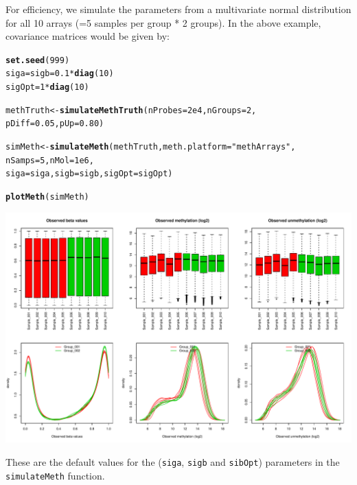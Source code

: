 \documentclass{article}\usepackage[]{graphicx}\usepackage[usenames,dvipsnames]{color}
\makeatletter
\def\maxwidth{ %
  \ifdim\Gin@nat@width>\linewidth
    \linewidth
  \else
    \Gin@nat@width
  \fi
}
\newcommand{\hlnum}[1]{\textcolor[rgb]{0.686,0.059,0.569}{#1}}%
\newcommand{\hlstr}[1]{\textcolor[rgb]{0.192,0.494,0.8}{#1}}%
\newcommand{\hlopt}[1]{\textcolor[rgb]{0,0,0}{#1}}%
\newcommand{\hlstd}[1]{\textcolor[rgb]{0.345,0.345,0.345}{#1}}%
\newcommand{\hlkwb}[1]{\textcolor[rgb]{0.69,0.353,0.396}{#1}}%
\newcommand{\hlkwc}[1]{\textcolor[rgb]{0.333,0.667,0.333}{#1}}%
\newcommand{\hlkwd}[1]{\textcolor[rgb]{0.737,0.353,0.396}{\textbf{#1}}}%
\newenvironment{kframe}{%
 \def\at@end@of@kframe{}%
 \ifinner\ifhmode%
  \def\at@end@of@kframe{\end{minipage}}%
  \begin{minipage}{\columnwidth}%
 \fi\fi%
 \def\FrameCommand##1{\hskip\@totalleftmargin \hskip-\fboxsep
 \colorbox{shadecolor}{##1}\hskip-\fboxsep
     \hskip-\linewidth \hskip-\@totalleftmargin \hskip\columnwidth}%
 \MakeFramed {\advance\hsize-\width
   \@totalleftmargin\z@ \linewidth\hsize
   \@setminipage}}%
 {\par\unskip\endMakeFramed%
 \at@end@of@kframe}
\newenvironment{knitrout}{}{} %
\makeatother
\begin{document}
For efficiency, we simulate the parameters from a multivariate normal 
distribution for all 10 arrays (=5 samples per group * 2 groups). In the 
above example, covariance matrices would be given by:
\begin{knitrout}
\color{fgcolor}\begin{kframe}
\begin{alltt}
\hlkwd{set.seed}\hlstd{(}\hlnum{999}\hlstd{)}
\hlstd{siga} \hlkwb{=} \hlstd{sigb} \hlkwb{=} \hlnum{0.1} \hlopt{*} \hlkwd{diag}\hlstd{(}\hlnum{10}\hlstd{)}
\hlstd{sigOpt} \hlkwb{=} \hlnum{1} \hlopt{*} \hlkwd{diag}\hlstd{(}\hlnum{10}\hlstd{)}

\hlstd{methTruth} \hlkwb{<-} \hlkwd{simulateMethTruth}\hlstd{(}\hlkwc{nProbes} \hlstd{=} \hlnum{2e4}\hlstd{,} \hlkwc{nGroups} \hlstd{=} \hlnum{2}\hlstd{,}
                               \hlkwc{pDiff} \hlstd{=} \hlnum{0.05}\hlstd{,} \hlkwc{pUp} \hlstd{=} \hlnum{0.80}\hlstd{)}
\end{alltt}


{\ttfamily\noindent\itshape\color{messagecolor}{\#\# [quantroSim]: Simulating a mixture of 3 Normal distributions \\\#\#\ \ \ \ \ \ \ \ \ \ \ \  with mean (-3, 1, 3) and standard deviation (3, 0.4, 3)}}\begin{alltt}
\hlstd{simMeth} \hlkwb{<-} \hlkwd{simulateMeth}\hlstd{(methTruth,}  \hlkwc{meth.platform} \hlstd{=} \hlstr{"methArrays"}\hlstd{,}
                        \hlkwc{nSamps} \hlstd{=} \hlnum{5}\hlstd{,} \hlkwc{nMol} \hlstd{=} \hlnum{1e6}\hlstd{,}
                        \hlkwc{siga} \hlstd{= siga,} \hlkwc{sigb} \hlstd{= sigb,} \hlkwc{sigOpt} \hlstd{= sigOpt)}
\end{alltt}


{\ttfamily\noindent\itshape\color{messagecolor}{\#\# Simulating DNA methylation samples using the meth.platform: methArrays}}\begin{alltt}
\hlkwd{plotMeth}\hlstd{(simMeth)}
\end{alltt}
\end{kframe}
\includegraphics[width=\maxwidth]{figure/simMeth-figs2-1} 

\end{knitrout}
These are the default values for the (\texttt{siga}, \texttt{sigb} 
and \texttt{sibOpt}) parameters in the \texttt{simulateMeth} function. 
\end{document}
